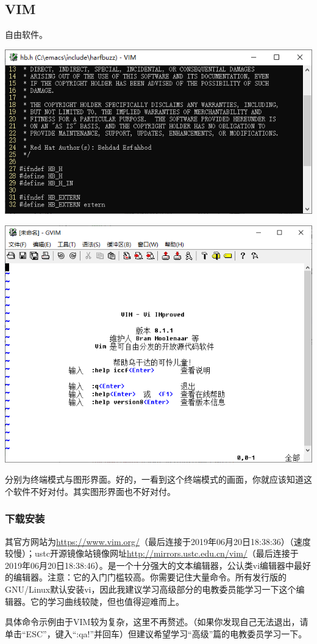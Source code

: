 \subsection{VIM}
自由软件。
\begin{center}
	\includegraphics[scale=0.7]{pic/vim.png}\par   \includegraphics[scale=0.7]{pic/gvim.png}
\end{center} \par
分别为终端模式与图形界面。好的，一看到这个终端模式的画面，你就应该知道这个软件不好对付。其实图形界面也不好对付。
\subsubsection{下载安装}
其官方网站为\url{https://www.vim.org/}（最后连接于2019年06月20日18:38:36）（速度较慢）；ustc开源镜像站镜像网址\url{http://mirrors.ustc.edu.cn/vim/}（最后连接于2019年06月20日18:38:46）。是一个十分强大的文本编辑器，公认类vi编辑器中最好的编辑器。注意：它的入门门槛较高。你需要记住大量命令。所有发行版的GNU/Linux默认安装vi，因此我建议学习高级部分的电教委员能学习一下这个编辑器。它的学习曲线较陡，但也值得迎难而上。\par
具体命令示例由于VIM较为复杂，这里不再赘述。（如果你发现自己无法退出，请单击“ESC”，键入“:qa!”并回车）但建议希望学习“高级”篇的电教委员学习一下。
